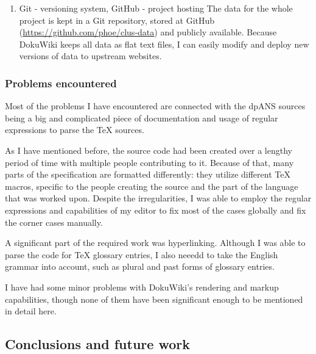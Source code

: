 \documentclass[11pt]{article}
\begin{document}
\begin{enumerate}
Because of this, I decided to abandon the approach of parsing the standard with a parser capable of processing \TeX{} directly and instead go for a simpler choice: utilizing a set of regular expressions to parse a subset of utilized \TeX{} macros and formatting. It would mean later polishing the preprocessed data by hand, though I would like to note that this last step would be necessary anyway regardless of the technique used.

My editor of choice, Notepad++, contained a powerful enough RegEx engine that was capable of guiding me through the process. Various bulk edits were also made through the assorted unix utilities: grep, sed, awk, rename.
\item Git - versioning system, GitHub - project hosting
\label{sec:orgfdbe5f0}
The data for the whole project is kept in a Git repository, stored at GitHub (\url{https://github.com/phoe/clus-data}) and publicly available. Because DokuWiki keeps all data as flat text files, I can easily modify and deploy new versions of data to upstream websites.
\end{enumerate}
\subsubsection{Problems encountered}
\label{sec:org1205e09}
Most of the problems I have encountered are connected with the dpANS sources being a big and complicated piece of documentation and usage of regular expressions to parse the \TeX{} sources.

As I have mentioned before, the source code had been created over a lengthy period of time with multiple people contributing to it. Because of that, many parts of the specification are formatted differently: they utilize different \TeX{} macros, specific to the people creating the source and the part of the language that was worked upon. Despite the irregularities, I was able to employ the regular expressions and capabilities of my editor to fix most of the cases globally and fix the corner cases manually.

A significant part of the required work was hyperlinking. Although I was able to parse the code for \TeX{} glossary entries, I also neeedd to take the English grammar into account, such as plural and past forms of glossary entries.

I have had some minor problems with DokuWiki's rendering and markup capabilities, though none of them have been significant enough to be mentioned in detail here.
\subsection{Conclusions and future work}
\label{sec:orga42aaf0}
\end{document}
